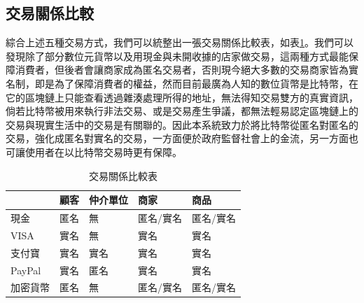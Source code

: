 		\subsection{交易關係比較}
		綜合上述五種交易方式，我們可以統整出一張交易關係比較表，如表\ref{txvs}。我們可以發現除了部分數位元貨幣以及用現金與未開收據的店家做交易，這兩種方式最能保障消費者，但後者會讓商家成為匿名交易者，否則現今絕大多數的交易商家皆為實名制，即是為了保障消費者的權益，然而目前最廣為人知的數位貨幣是比特幣，在它的區塊鏈上只能查看透過雜湊處理所得的地址，無法得知交易雙方的真實資訊，倘若比特幣被用來執行非法交易、或是交易產生爭議，都無法輕易認定區塊鏈上的交易與現實生活中的交易是有關聯的。因此本系統致力於將比特幣從匿名對匿名的交易，強化成匿名對實名的交易，一方面便於政府監督社會上的金流，另一方面也可讓使用者在以比特幣交易時更有保障。

		\begin{table}[htbp]
		\centering
		\caption{交易關係比較表}
		\label{txvs}
		\begin{tabular}{|l|l|l|l|l|}
		\hline
		 & 顧客 & 仲介單位 & 商家 & 商品 \\ \hline
		現金 & 匿名 & 無 & 匿名/實名 & 匿名/實名 \\ \hline
		VISA & 實名 & 無 & 實名 & 實名 \\ \hline
		支付寶 & 實名 & 實名 & 實名 & 實名 \\ \hline
		PayPal & 實名 & 匿名 & 實名 & 實名 \\ \hline
		加密貨幣 & 匿名 & 無 & 匿名/實名 & 匿名/實名 \\ \hline
		\end{tabular}
		\end{table}

